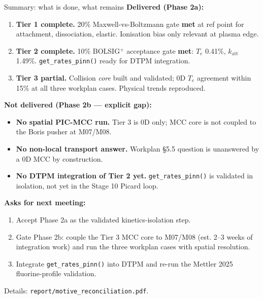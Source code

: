 \documentclass[10pt,aspectratio=169]{beamer}
\begin{document}
\begin{frame}{Summary: what is done, what remains}
  \footnotesize
  \textbf{Delivered (Phase 2a):}
  \begin{enumerate}\footnotesize
    \item \textbf{Tier 1 complete.} 20\% Maxwell-vs-Boltzmann gate
          \textbf{met} at ref point for attachment, dissociation,
          elastic. Ionisation bias only relevant at plasma edge.
    \item \textbf{Tier 2 complete.} 10\% BOLSIG$^+$ acceptance gate
          \textbf{met}: $T_e$ 0.41\%, $k_{\mathrm{att}}$ 1.49\%.
          \texttt{get\_rates\_pinn()} ready for DTPM integration.
    \item \textbf{Tier 3 partial.} Collision \emph{core} built and
          validated; 0D $T_e$ agreement within 15\% at all three
          workplan cases. Physical trends reproduced.
  \end{enumerate}

  \vspace{0.3em}
  \textbf{\textcolor{red!70!black}{Not delivered (Phase 2b ---
  explicit gap):}}
  \begin{itemize}\footnotesize
    \item[$\times$] \textbf{No spatial PIC-MCC run.} Tier 3 is 0D
          only; MCC core is not coupled to the Boris pusher at
          M07/M08.
    \item[$\times$] \textbf{No non-local transport answer.}
          Workplan \S5.5 question is unanswered by a 0D MCC by
          construction.
    \item[$\times$] \textbf{No DTPM integration of Tier 2 yet.}
          \texttt{get\_rates\_pinn()} is validated in isolation,
          not yet in the Stage 10 Picard loop.
  \end{itemize}

  \vspace{0.3em}
  \textbf{Asks for next meeting:}
  \begin{enumerate}\footnotesize
    \item Accept Phase 2a as the validated kinetics-isolation step.
    \item Gate Phase 2b: couple the Tier 3 MCC core to M07/M08
          (est. 2--3 weeks of integration work) and run the three
          workplan cases with spatial resolution.
    \item Integrate \texttt{get\_rates\_pinn()} into DTPM and re-run
          the Mettler 2025 fluorine-profile validation.
  \end{enumerate}

  \vspace{0.2em}
  Details: \texttt{report/motive\_reconciliation.pdf}.
\end{frame}
\end{document}
